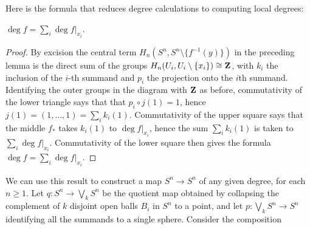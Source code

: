 Here is the formula that reduces degree calculations to computing local
degrees:
\begin{proposition}[2.30]
$\deg f=\sum_i\deg f|_{x_i}$.
\end{proposition}
\begin{proof}
By excision the central term $H_n(S^n,S^n\setminus\{f^{-1}(y)\})$ in the
preceding lemma is the direct sum of the groups
$H_n(U_i,U_i\setminus\{x_i\})\cong\mathbf{Z}$, with $k_i$ the inclusion of the
$i$-th  summand and $p_i$ the projection onto the $i$th
summand. Identifying the outer groups in the diagram with $\mathbf{Z}$ as before,
commutativity of the lower triangle says that that $p_i\circ j(1)=1$, hence
$j(1)=(1,\dotsc,1)=\sum_ik_i(1)$. Commutativity of the upper square says
that the middle $f_*$ takes $k_i(1)$ to $\deg f|_{x_i}$, hence the sum
$\sum_ik_i(1)$ is taken to $\sum_i\deg f|_{x_i}$. Commutativity of the
lower square then gives the formula $\deg f=\sum_i\deg f|_{x_i}$.
\end{proof}
\begin{example}[2.31]
We can use this result to construct a map $S^n\to S^n$ of any given degree,
for each $n\geq 1$. Let $q\colon S^n\to \bigvee_k S^n$ be the quotient map
obtained by collapsing the complement of $k$ disjoint open balls $B_i$ in
$S^n$ to a point, and let $p\colon\bigvee_k S^n\to S^n$ identifying all the
summands to a single sphere. Consider the composition
\end{example}



